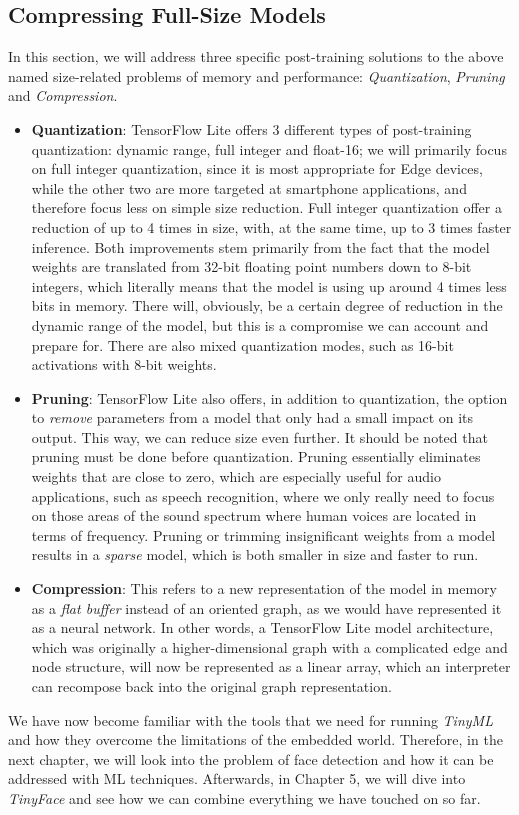 \subsection{Compressing Full-Size Models}
In this section, we will address three specific post-training solutions to the above named size-related problems of memory and performance: \textit{Quantization}, \textit{Pruning} and \textit{Compression}. \par
\begin{itemize}
    \item \textbf{Quantization}: TensorFlow Lite offers 3 different types of post-training quantization: dynamic range, full integer and float-16; we will primarily focus on full integer quantization, since it is most appropriate for Edge devices, while the other two are more targeted at smartphone applications, and therefore focus less on simple size reduction. Full integer quantization offer a reduction of up to 4 times in size, with, at the same time, up to 3 times faster inference. Both improvements stem primarily from the fact that the model weights are translated from 32-bit floating point numbers down to 8-bit integers, which literally means that the model is using up around 4 times less bits in memory.  \cite{tflite_quantization} There will, obviously, be a certain degree of reduction in the dynamic range of the model, but this is a compromise we can account and prepare for. There are also mixed quantization modes, such as 16-bit activations with 8-bit weights.
    \item \textbf{Pruning}: TensorFlow Lite also offers, in addition to quantization, the option to \textit{remove} parameters from a model that only had a small impact on its output. This way, we can reduce size even further. It should be noted that pruning must be done before quantization. Pruning essentially eliminates weights that are close to zero, which are especially useful for audio applications, such as speech recognition, where we only really need to focus on those areas of the sound spectrum where human voices are located in terms of frequency. Pruning or trimming insignificant weights from a model results in a \textit{sparse} model, which is both smaller in size and faster to run. \cite{tflite_pruning}
    \item \textbf{Compression}: This refers to a new representation of the model in memory as a \textit{flat buffer} instead of an oriented graph, as we would have represented it as a neural network. In other words, a TensorFlow Lite model architecture, which was originally a higher-dimensional graph with a complicated edge and node structure, will now be represented as a linear array, which an interpreter can recompose back into the original graph representation. \cite{google_prot_buf}
\end{itemize}

We have now become familiar with the tools that we need for running \textit{TinyML} and how they overcome the limitations of the embedded world. Therefore, in the next chapter, we will look into the problem of face detection and how it can be addressed with ML techniques. Afterwards, in Chapter 5, we will dive into \textit{TinyFace} and see how we can combine everything we have touched on so far.
